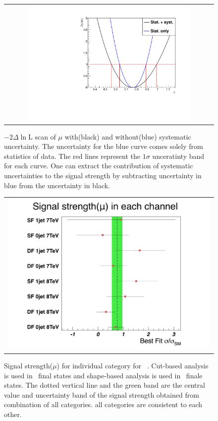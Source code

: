 %
\begin{figure}[htp] 
\centering 
\begin{tabular}{c} 
\includegraphics[width=0.8\textwidth]{figures/MuDeltaNLL.pdf}
\end{tabular} 
\caption{ $- 2\Delta\ln \textrm{L}$ scan of $\mu$ with(black) 
and without(blue) systematic uncertainty.
The uncertainty for the blue curve comes solely from statistics of data.
The red lines represent the $1\sigma$ unceratinty band for each curve. 
One can extract the contribution of systematic uncertainties to the signal strength
by subtracting uncertainty in blue from the uncertainty in black.} 
\label{fig:mu_scan} 
\end{figure} 

%
\begin{figure}[htp] 
\centering 
\begin{tabular}{c} 
\includegraphics[width=0.99\textwidth]{figures/mu_allchannels.pdf}
\end{tabular} 
\caption{ Signal strength($\mu$) for individual category for ~\GeV.
Cut-based analysis is used in \SF\ final states 
and shape-based analysis is used in \DF\ finale states. 
The dotted vertical line and the green band are 
the central value and uncertainty band of the signal strength 
obtained from combination of all categories. 
all categories are consistent to each other.
} 
\label{fig:mu_allchannels} 
\end{figure} 

